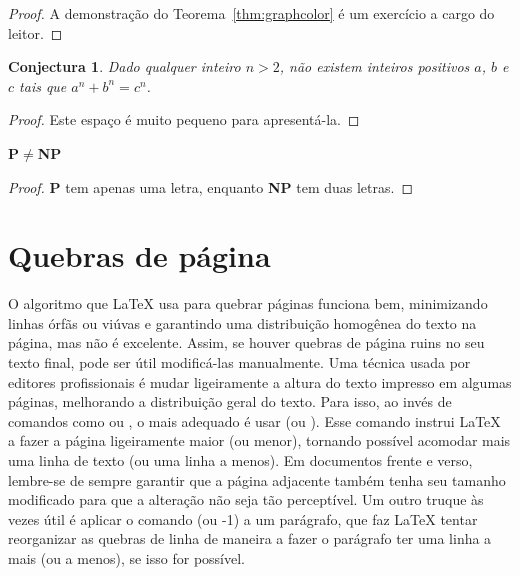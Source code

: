 \begin{proof}
  A demonstração do Teorema~\ref{thm:graphcolor} é um exercício
  a cargo do leitor.
  \renewcommand\qedsymbol{} %
\end{proof}

\theoremstyle{maybe} %
\newtheorem{conjecture}{Conjectura}

\begin{conjecture}
  \label{conj:fermat}
  Dado qualquer inteiro $n > 2$, não existem inteiros positivos
  $a$, $b$ e $c$ tais que $a^n + b^n = c^n$.
\end{conjecture}

\begin{proof}
  Este espaço é muito pequeno para apresentá-la.
  \renewcommand\qedsymbol{}
\end{proof}

\begin{theorem}
  \label{thm:pnp}
  \textup{\textsf{\textbf{P$\ne$NP}}}
\end{theorem}

\begin{proof}
  \textsf{\textbf{P}} tem apenas uma letra, enquanto
  \textsf{\textbf{NP}} tem duas letras.
\end{proof}


\section{Quebras de página}
\label{sec:quebras}

O algoritmo que \LaTeX{} usa para quebrar páginas funciona bem, minimizando
linhas órfãs ou viúvas e garantindo uma distribuição homogênea do texto na
página, mas não é excelente. Assim, se houver quebras de página ruins no
seu texto final, pode ser útil modificá-las manualmente. Uma técnica usada
por editores profissionais é mudar ligeiramente a altura do texto impresso
em algumas páginas, melhorando a distribuição geral do texto. Para isso,
ao invés de comandos como  ou , o mais
adequado é usar  (ou
). Esse comando instrui \LaTeX{} a fazer a
página ligeiramente maior (ou menor), tornando possível acomodar mais
uma linha de texto (ou uma linha a menos). Em documentos frente e verso,
lembre-se de sempre garantir que a página adjacente também tenha seu
tamanho modificado para que a alteração não seja tão perceptível. Um
outro truque às vezes útil é aplicar o comando  (ou
-1) a um parágrafo, que faz \LaTeX{} tentar reorganizar as quebras de
linha de maneira a fazer o parágrafo ter uma linha a mais (ou a menos),
se isso for possível.

